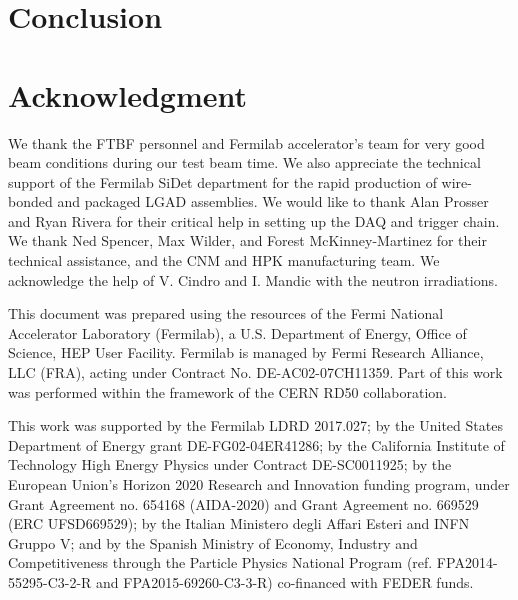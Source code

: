 \documentclass[preprint,1p]{elsarticle}
\begin{document}
\section{Conclusion}
\label{sec:conclusion}


\section*{Acknowledgment}

We thank the FTBF personnel and Fermilab accelerator's team for very good beam
conditions during our test beam time. We also appreciate the technical support
of the Fermilab SiDet department for the rapid production of wire-bonded and
packaged LGAD assemblies. We would like to thank Alan Prosser and Ryan Rivera
for their critical help in setting up the DAQ and trigger chain. We thank Ned
Spencer, Max Wilder, and Forest McKinney-Martinez for their technical
assistance, and the CNM and HPK manufacturing team. We acknowledge the help of
V. Cindro and I. Mandic with the neutron irradiations.

This document was prepared using the resources of the Fermi National Accelerator
Laboratory (Fermilab), a U.S. Department of Energy, Office of Science, HEP User
Facility. Fermilab is managed by Fermi Research Alliance, LLC (FRA), acting
under Contract No. DE-AC02-07CH11359. Part of this work was performed within the
framework of the CERN RD50 collaboration.

This work was supported by the Fermilab LDRD 2017.027; by the United States
Department of Energy grant DE-FG02-04ER41286; by the California Institute of
Technology High Energy Physics under Contract DE-SC0011925; by the European
Union's Horizon 2020 Research and Innovation funding program, under Grant
Agreement no. 654168 (AIDA-2020) and Grant Agreement no. 669529 (ERC
UFSD669529); by the Italian Ministero degli Affari Esteri and INFN Gruppo V; and
by the Spanish Ministry of Economy, Industry and Competitiveness through the
Particle Physics National Program (ref. FPA2014-55295-C3-2-R and
FPA2015-69260-C3-3-R) co-financed with FEDER funds.



\end{document}
